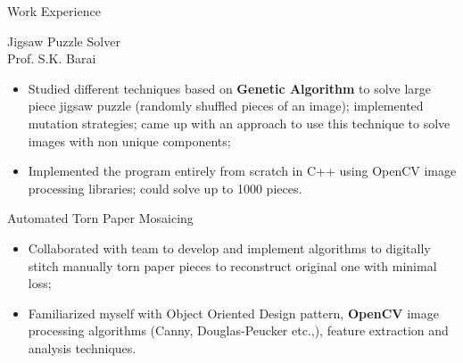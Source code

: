 \documentclass{article}
\newlength{\tabin}
\newlength{\secsep}
\newcommand{\lineunder}{\vspace*{-8pt} \\ \hspace*{-6pt} \hrulefill \\ \vspace*{-15pt}}
\newenvironment{tabbedsection}[1]{
  \begin{list}{}{
      \setlength{\itemsep}{0pt}
      \setlength{\labelsep}{0pt}
      \setlength{\labelwidth}{0pt}
      \setlength{\leftmargin}{\tabin}
      \setlength{\rightmargin}{\tabin}
      \setlength{\listparindent}{0pt}
      \setlength{\parsep}{0pt}
      \setlength{\parskip}{0pt}
      \setlength{\partopsep}{0pt}
      \setlength{\topsep}{#1}
    }
  \item[]
}{\end{list}}
\newenvironment{resume_section}[1]{
  \filbreak
  \vspace{2\secsep}
  \textsc{\large#1}
  \lineunder
  \begin{tabbedsection}{\secsep}
}{\end{tabbedsection}}
\newenvironment{resume_subsection}[2][]{
  \textbf{#2} \hfill {\footnotesize #1} \hspace*{-3.5em}
  \begin{tabbedsection}{0.5\secsep}
}{\end{tabbedsection}}
\newenvironment{subitems}{
  \renewcommand{\labelitemi}{$\cdot$}
  \begin{itemize}
      \setlength{\labelsep}{1em}
}{\end{itemize}}
\begin{document}
\begin{resume_section}  {Work Experience}
  \begin{resume_subsection}[Mar, 2014]{Jigsaw Puzzle Solver \\ \footnotesize {Prof. S.K. Barai}}
    \begin{subitems}
    \item Studied different techniques based on \textbf{Genetic Algorithm} to solve large piece jigsaw puzzle (randomly shuffled pieces of an image); implemented mutation strategies; came up with an approach to use this technique to solve images with non unique components;
    \item Implemented the program entirely from scratch in C++ using OpenCV image processing libraries; could solve up to 1000 pieces.\\
    \end{subitems}
  \end{resume_subsection}

  \begin{resume_subsection}[Mar, 2014]{Automated Torn Paper Mosaicing}
  \begin{subitems}
    \item Collaborated with team to develop and implement algorithms to digitally stitch manually torn paper pieces to reconstruct original one with minimal loss;
    \item Familiarized myself with Object Oriented Design pattern, \textbf{OpenCV} image processing algorithms (Canny, Douglas-Peucker etc.,), feature extraction and analysis techniques.
    \end{subitems}
  \end{resume_subsection}
\end{resume_section}
\end{document}
